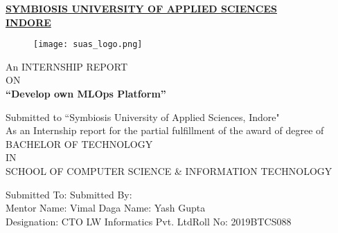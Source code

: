\documentclass[12pt,oneside,a4paper]{report}
\begin{document}

\begin{large}
\begin{center}
\fontsize{18pt}{10pt}\selectfont
\underline{\textbf{SYMBIOSIS UNIVERSITY OF APPLIED SCIENCES}}\\
\vspace{5.0mm}\underline{\textbf{INDORE}}
\end{center}
\end{large}
\vspace{5.0mm}

\begin{figure}[h]
\centering
\texttt{[image: suas\_logo.png]}
\end{figure}

\begin{center}
\fontsize{14pt}{10pt}\selectfont
\vspace{0.3in} An INTERNSHIP REPORT\\ \vspace{5.0mm}ON\\ 
\vspace{5.0mm}\textbf{“Develop own MLOps Platform”}


\fontsize{14pt}{10pt}\selectfont
\vspace{0.4in} Submitted to “Symbiosis University of Applied Sciences, Indore"\\
\fontsize{14pt}{10pt}\selectfont
As an Internship report for the partial fulfillment of the award of degree of\\
\vspace{0.5in}
BACHELOR OF TECHNOLOGY\\ \vspace{5.0mm}IN\\ \vspace{5.0mm} SCHOOL OF COMPUTER SCIENCE \& INFORMATION TECHNOLOGY
\end{center}
\begin{flushleft}
\vspace{15.0mm}\hspace{10mm}Submitted To:
\hspace{3.0in} Submitted By:\\ \hspace{10mm}Mentor Name: Vimal Daga \hspace{2.1in} Name: Yash Gupta\\ \hspace{10mm}Designation: CTO LW Informatics Pvt. Ltd\hspace{0.99in}Roll No: 2019BTCS088
\end{flushleft}
\end{document}
